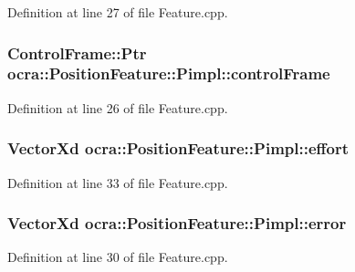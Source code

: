 Definition at line 27 of file Feature.\+cpp.

\subsubsection[{\texorpdfstring{control\+Frame}{controlFrame}}]{\setlength{\rightskip}{0pt plus 5cm}Control\+Frame\+::\+Ptr ocra\+::\+Position\+Feature\+::\+Pimpl\+::control\+Frame}\hypertarget{structocra_1_1PositionFeature_1_1Pimpl_ad770aac1608c2e6ccf13ee84539313c5}{}\label{structocra_1_1PositionFeature_1_1Pimpl_ad770aac1608c2e6ccf13ee84539313c5}


Definition at line 26 of file Feature.\+cpp.

\subsubsection[{\texorpdfstring{effort}{effort}}]{\setlength{\rightskip}{0pt plus 5cm}Vector\+Xd ocra\+::\+Position\+Feature\+::\+Pimpl\+::effort}\hypertarget{structocra_1_1PositionFeature_1_1Pimpl_a66425331a37215913daa3ca7de5bce57}{}\label{structocra_1_1PositionFeature_1_1Pimpl_a66425331a37215913daa3ca7de5bce57}


Definition at line 33 of file Feature.\+cpp.

\subsubsection[{\texorpdfstring{error}{error}}]{\setlength{\rightskip}{0pt plus 5cm}Vector\+Xd ocra\+::\+Position\+Feature\+::\+Pimpl\+::error}\hypertarget{structocra_1_1PositionFeature_1_1Pimpl_ab0c14028446505c11d15d0dfce51b97a}{}\label{structocra_1_1PositionFeature_1_1Pimpl_ab0c14028446505c11d15d0dfce51b97a}


Definition at line 30 of file Feature.\+cpp.

